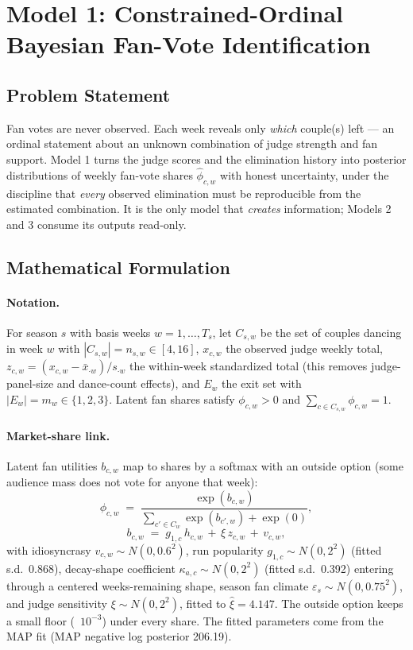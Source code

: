 \documentclass[11pt]{article}
\begin{document}
\section{Model 1: Constrained-Ordinal Bayesian Fan-Vote Identification}
\label{sec:model1}

\subsection{Problem Statement}

Fan votes are never observed. Each week reveals only \emph{which} couple(s) left --- an
ordinal statement about an unknown combination of judge strength and fan support.
Model 1 turns the judge scores and the elimination history into posterior
distributions of weekly fan-vote shares $\hat\phi_{c,w}$ with honest uncertainty,
under the discipline that \emph{every} observed elimination must be reproducible
from the estimated combination. It is the only model that \emph{creates}
information; Models 2 and 3 consume its outputs read-only.

\subsection{Mathematical Formulation}

\paragraph{Notation.} For season $s$ with basis weeks $w = 1,\dots,T_s$, let
$C_{s,w}$ be the set of couples dancing in week $w$ with $|C_{s,w}| = n_{s,w} \in
[4,16]$, $x_{c,w}$ the observed judge weekly total, $z_{c,w} = (x_{c,w} - \bar
x_{\cdot w})/s_{\cdot w}$ the within-week standardized total (this removes
judge-panel-size and dance-count effects), and $E_w$ the exit set with
$|E_w| = m_w \in \{1,2,3\}$. Latent fan shares satisfy $\phi_{c,w} > 0$ and
$\sum_{c \in C_{s,w}} \phi_{c,w} = 1$.

\paragraph{Market-share link.} Latent fan utilities $b_{c,w}$ map to shares by a
softmax with an outside option (some audience mass does not vote for anyone that
week):
\begin{equation}
\phi_{c,w} \;=\; \frac{\exp(b_{c,w})}{\sum_{c' \in C_{w}} \exp(b_{c',w}) + \exp(0)},
\label{eq:softmax}
\end{equation}
\begin{equation}
b_{c,w} \;=\; g_{1,c} \, h_{c,w} \, + \, \xi\, z_{c,w} \, + \, v_{c,w},
\label{eq:util}
\end{equation}
with idiosyncrasy $v_{c,w} \sim N(0, 0.6^2)$, run popularity $g_{1,c} \sim N(0,2^2)$
(fitted s.d.\ 0.868), decay-shape coefficient $\kappa_{a,c} \sim N(0,2^2)$ (fitted
s.d.\ 0.392) entering through a centered weeks-remaining shape, season fan climate
$\varepsilon_s \sim N(0, 0.75^2)$, and judge sensitivity $\xi \sim N(0,2^2)$,
fitted to $\hat\xi = 4.147$. The outside option keeps a small floor (~$10^{-3}$)
under every share. The fitted parameters come from the MAP fit (MAP negative log
posterior 206.19).
\end{document}
